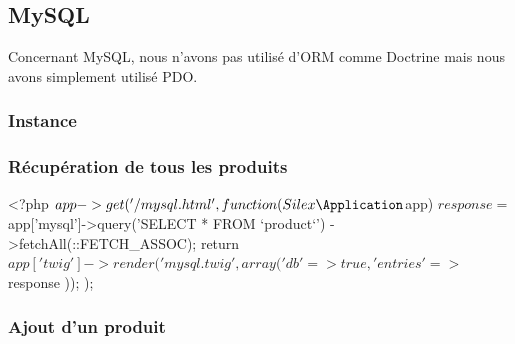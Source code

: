 \documentclass[11pt,a4paper]{report}
\begin{document}
            \subsection{MySQL}
                
                Concernant MySQL, nous n'avons pas utilis\'e d'ORM comme Doctrine mais nous avons simplement utilis\'e PDO.
                
                \subsubsection{Instance}
                    
                    
                \subsubsection{R\'ecup\'eration de tous les produits}
                    
                    \begin{phpcode}
                        <?php
                        $app->get('/mysql.html', function(Silex\Application $app) {
                            $response = $app['mysql']->query('SELECT * FROM `product`')
                                        ->fetchAll(\PDO::FETCH_ASSOC);
                            return $app['twig']->render('mysql.twig', array(
                                'db'        => true,
                                'entries'   => $response
                            ));
                        });
                    \end{phpcode}
                    
                \subsubsection{Ajout d'un produit}
                    
\end{document}
